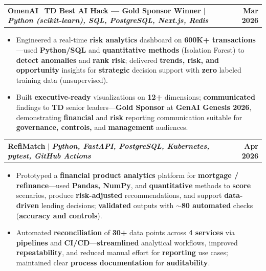 \documentclass[letterpaper,10pt]{article}
\makeatletter
\newcommand{\resumeItem}[1]{
  \item\small{
    {#1 \vspace{-1pt}}
  }
}
\newcommand{\resumeProjectHeading}[2]{
    \item
    \begin{tabular*}{1.001\textwidth}{l@{\extracolsep{\fill}}r}
      \small#1 & \textbf{\small #2}\\
    \end{tabular*}\vspace{-9pt}
}
\newcommand{\resumeItemListStart}{\begin{itemize}[leftmargin=0.15in]}
\newcommand{\resumeItemListEnd}{\end{itemize}\vspace{-4pt}}
\makeatother
\begin{document}
    \resumeProjectHeading
          {\textbf{OmenAI} \textbar\ \textbf{TD Best AI Hack --- Gold Sponsor Winner} $|$ \emph{\textbf{Python (scikit-learn), SQL, PostgreSQL, Next.js, Redis}}}{Mar 2026}
    \resumeItemListStart
        \resumeItem{Engineered a real-time \textbf{risk analytics} dashboard on \textbf{600K+ transactions}---used \textbf{Python/SQL} and \textbf{quantitative methods} (Isolation Forest) to \textbf{detect anomalies} and \textbf{rank risk}; delivered \textbf{trends, risk, and opportunity} insights for \textbf{strategic} decision support with \textbf{zero} labeled training data (unsupervised).}
        \vspace{-2pt}
        \resumeItem{Built \textbf{executive-ready} visualizations on \textbf{12+} dimensions; \textbf{communicated} findings to \textbf{TD} senior leaders---\textbf{Gold Sponsor} at \textbf{GenAI Genesis 2026}, demonstrating \textbf{financial} and \textbf{risk} reporting communication suitable for \textbf{governance, controls,} and \textbf{management} audiences.}
    \resumeItemListEnd
    \vspace{-18pt}

    \resumeProjectHeading
          {\textbf{RefiMatch} $|$ \emph{\textbf{Python, FastAPI, PostgreSQL, Kubernetes, pytest, GitHub Actions}}}{Apr 2026}
    \resumeItemListStart
            \resumeItem{Prototyped a \textbf{financial product analytics} platform for \textbf{mortgage / refinance}---used \textbf{Pandas, NumPy}, and \textbf{quantitative} methods to \textbf{score} scenarios, produce \textbf{risk-adjusted} recommendations, and support \textbf{data-driven} lending decisions; \textbf{validated} outputs with \textbf{$\sim$80 automated} checks (\textbf{accuracy and controls}).}
            \vspace{-2pt}
            \resumeItem{Automated \textbf{reconciliation} of \textbf{30+} data points across \textbf{4 services} via \textbf{pipelines} and \textbf{CI/CD}---\textbf{streamlined} analytical workflows, improved \textbf{repeatability}, and reduced manual effort for \textbf{reporting} use cases; maintained clear \textbf{process documentation} for \textbf{auditability}.}
    \resumeItemListEnd
    \vspace{-18pt}
\end{document}
